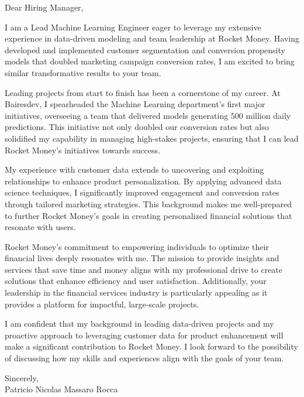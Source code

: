 \documentclass{article}
\begin{document}
\noindent Dear Hiring Manager,


I am a Lead Machine Learning Engineer eager to leverage my extensive experience in data-driven modeling and team leadership at Rocket Money. Having developed and implemented customer segmentation and conversion propensity models that doubled marketing campaign conversion rates, I am excited to bring similar transformative results to your team.


Leading projects from start to finish has been a cornerstone of my career. At Bairesdev, I spearheaded the Machine Learning department's first major initiatives, overseeing a team that delivered models generating 500 million daily predictions. This initiative not only doubled our conversion rates but also solidified my capability in managing high-stakes projects, ensuring that I can lead Rocket Money's initiatives towards success.


My experience with customer data extends to uncovering and exploiting relationships to enhance product personalization. By applying advanced data science techniques, I significantly improved engagement and conversion rates through tailored marketing strategies. This background makes me well-prepared to further Rocket Money's goals in creating personalized financial solutions that resonate with users.


Rocket Money's commitment to empowering individuals to optimize their financial lives deeply resonates with me. The mission to provide insights and services that save time and money aligns with my professional drive to create solutions that enhance efficiency and user satisfaction. Additionally, your leadership in the financial services industry is particularly appealing as it provides a platform for impactful, large-scale projects.


I am confident that my background in leading data-driven projects and my proactive approach to leveraging customer data for product enhancement will make a significant contribution to Rocket Money. I look forward to the possibility of discussing how my skills and experiences align with the goals of your team.

\vspace{1cm}
\setlength{\parskip}{0em}
\begin{flushright}
Sincerely,\\
Patricio Nicolas Massaro Rocca
\end{flushright}
\end{document}
